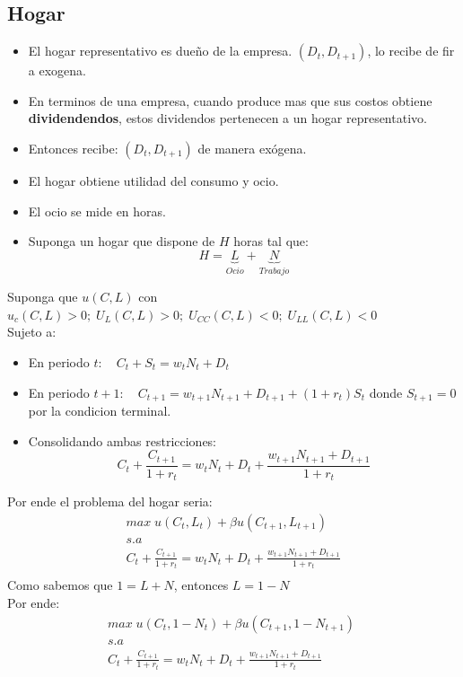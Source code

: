 \documentclass[12pt]{article}
\begin{document}
\subsection{Hogar}
\begin{itemize}
    \item El hogar representativo es dueño de la empresa. $(D_t,D_{t+1})$, lo recibe de fir a exogena. 
    \item En terminos de una empresa, cuando produce mas que sus costos obtiene \textbf{dividendendos}, estos dividendos pertenecen a un hogar representativo.
    \item Entonces recibe: $(D_t,D_{t+1})$ de manera exógena. 
    \item El hogar obtiene utilidad del consumo y ocio. 
    \item El ocio se mide en horas. 
    \item Suponga un hogar que dispone de $H$ horas tal que: 
    $$H=\underbrace{L}_{Ocio}+\underbrace{N}_{Trabajo}$$
\end{itemize}
 Suponga que $u(C,L)$ con $u_c(C,L)>0;\; U_L(C,L)>0;\;U_{CC}(C,L)<0;\;U_{LL}(C,L)<0$\\
 Sujeto a: 
 \begin{itemize}
     \item En periodo $t:\quad C_t+S_t=w_tN_t+D_t$
     \item En periodo $t+1:\quad C_{t+1}=w_{t+1}N_{t+1}+D_{t+1}+(1+r_t)S_t$ donde $S_{t+1}=0$ por la condicion terminal. 
     \item Consolidando ambas restricciones: 
     $$C_t+\frac{C_{t+1}}{1+r_t}=w_tN_t+D_t+\frac{w_{t+1}N_{t+1}+D_{t+1}}{1+r_t}$$
 \end{itemize}
 Por ende el problema del hogar seria: 
 \begin{align*}
     max \;u(C_t,L_t)+\beta u(C_{t+1},L_{t+1})\; \\s.a\;\;\quad \quad \quad \quad \\ C_t+\frac{C_{t+1}}{1+r_t}=w_tN_t+D_t+\frac{w_{t+1}N_{t+1}+D_{t+1}}{1+r_t} \\
 \end{align*}
Como sabemos que $1=L+N$, entonces $L=1-N$\\
Por ende: 
 \begin{align*}
     max \;u(C_t,1-N_t)+\beta u(C_{t+1},1-N_{t+1})\; \\s.a\;\;\quad \quad \quad \quad \\ C_t+\frac{C_{t+1}}{1+r_t}=w_tN_t+D_t+\frac{w_{t+1}N_{t+1}+D_{t+1}}{1+r_t} \\
 \end{align*}
\end{document}
